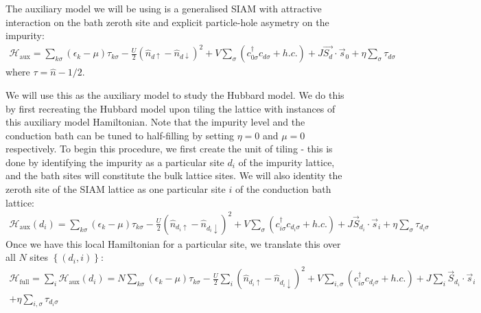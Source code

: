 \documentclass{report}
\numberwithin{equation}{section}
\begin{document}
The auxiliary model we will be using is a generalised SIAM with attractive interaction on the bath zeroth site and explicit particle-hole asymetry on the impurity:
\begin{equation}\begin{aligned}
	\mathcal{H}_\text{aux} = \sum_{k\sigma}\left(\epsilon_k - \mu\right)\tau_{k\sigma} - \frac{U}{2}\left(\hat n_{d \uparrow} - \hat n_{d \downarrow} \right) ^2 + V \sum_{\sigma} \left(c^\dagger_{0\sigma} c_{d\sigma} + h.c.\right) +J \vec{S_d}\cdot\vec{s}_0 + \eta \sum_\sigma\tau_{d\sigma}
\end{aligned}\end{equation}
where \(\tau = \hat n - 1/2\).

We will use this as the auxiliary model to study the Hubbard model. We do this by first recreating the Hubbard model upon tiling the lattice with instances of this auxiliary model Hamiltonian. Note that the impurity level and the conduction bath can be tuned to half-filling by setting \(\eta=0\) and \(\mu=0\) respectively. To begin this procedure, we first create the unit of tiling - this is done by identifying the impurity as a particular site \(d_i\) of the impurity lattice, and the bath sites will constitute the bulk lattice sites. We will also identity the zeroth site of the SIAM lattice as one particular site \(i\) of the conduction bath lattice:
\begin{equation}\begin{aligned}
	\mathcal{H}_\text{aux}(d_i) = \sum_{k\sigma}\left(\epsilon_k - \mu\right)\tau_{k\sigma} - \frac{U}{2}\left(\hat n_{d_i \uparrow} - \hat n_{d_i \downarrow} \right) ^2 + V \sum_{\sigma} \left(c^\dagger_{i\sigma} c_{d_i\sigma} + h.c.\right) +J \vec{S}_{d_i}\cdot\vec{s}_i + \eta \sum_\sigma\tau_{d_i\sigma}
\end{aligned}\end{equation}
Once we have this local Hamiltonian for a particular site, we translate this over all \(N\) sites \(\left\{\left(d_i,i\right) \right\} \):
\begin{equation}\begin{aligned}
	\mathcal{H}_\text{full} = \sum_{i} \mathcal{H}_\text{aux}(d_i) = N\sum_{k\sigma}\left(\epsilon_k - \mu\right)\tau_{k\sigma} - \frac{U}{2}\sum_{i}\left(\hat n_{d_i \uparrow} - \hat n_{d_i \downarrow} \right) ^2 + V \sum_{i,\sigma} \left(c^\dagger_{i\sigma} c_{d_i\sigma} + h.c.\right) +J \sum_i\vec{S}_{d_i}\cdot\vec{s}_i \\
	+ \eta \sum_{i,\sigma}\tau_{d_i\sigma}
\end{aligned}\end{equation}
\end{document}
